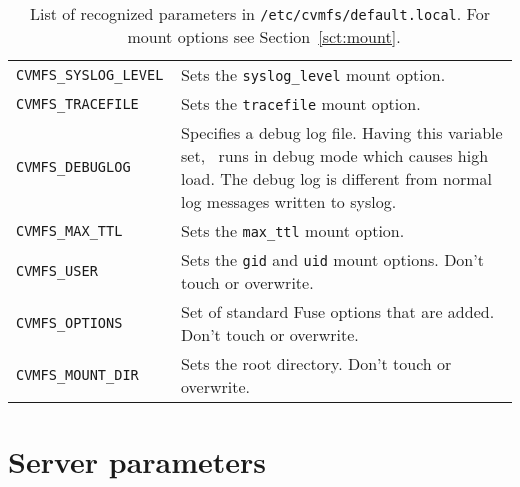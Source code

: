 \begin{table}
\begin{center}
\begin{tabularx}{\linewidth}{lX}
			\tt CVMFS\_SYSLOG\_LEVEL & Sets the \texttt{syslog\_level} mount option. \\
			\tt CVMFS\_TRACEFILE & Sets the \texttt{tracefile} mount option.\\
			\tt CVMFS\_DEBUGLOG & Specifies a debug log file.  Having this variable set, \cvmfs\ runs in debug mode which causes high load.  The debug log is different from normal log messages written to syslog.\\
			\tt CVMFS\_MAX\_TTL & Sets the \texttt{max\_ttl} mount option.\\
			\tt CVMFS\_USER & Sets the \texttt{gid} and \texttt{uid} mount options. Don't touch or overwrite.\\
			\tt CVMFS\_OPTIONS & Set of standard Fuse options that are added. Don't touch or overwrite. \\
			\tt CVMFS\_MOUNT\_DIR & Sets the \cvmfs root directory. Don't touch or overwrite. \\
		\end{tabularx}
	\end{center}
	\caption{List of recognized parameters in \texttt{/etc/cvmfs/default.local}. For \cvmfs\ mount options see Section~\ref{sct:mount}.}
	\label{tbl:parameters}
\end{table}


\section{Server parameters}
